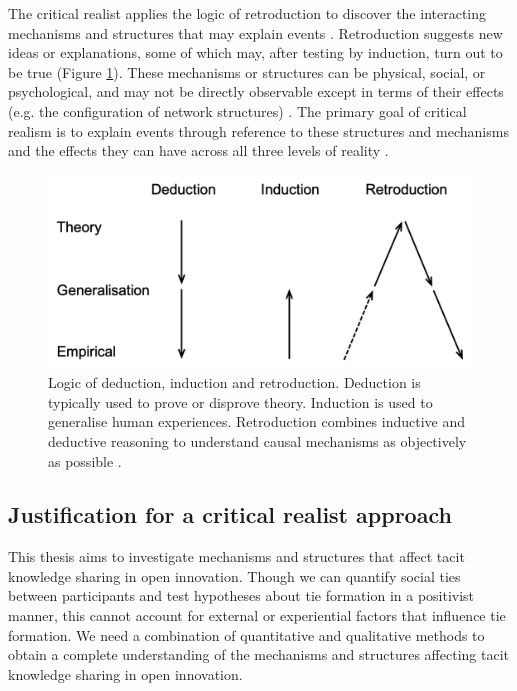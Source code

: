 The critical realist applies the logic of retroduction to discover the interacting mechanisms and structures that may explain events \citep{sayer1999realism,wynn2012principles}. Retroduction suggests new ideas or explanations, some of which may, after testing by induction, turn out to be true (Figure \ref{fig:retroduction}). These mechanisms or structures can be physical, social, or psychological, and may not be directly observable except in terms of their effects (e.g. the configuration of network structures) \citep{mcavoy2018critical}. The primary goal of critical realism is to explain events through reference to these structures and mechanisms and the effects they can have across all three levels of reality \citep{wynn2012principles,fletcher2017applying}. \medskip

\begin{figure}[h!]
\centering
\includegraphics[width=0.7\linewidth]{Images/retroduction.png}
\caption[Logic of deduction, induction and retroduction]{Logic of deduction, induction and retroduction. Deduction is typically used to prove or disprove theory. Induction is used to generalise human experiences. Retroduction combines inductive and deductive reasoning to understand causal mechanisms as objectively as possible \citep{saether1998retroduction}.}
\label{fig:retroduction}
\end{figure}

\subsection{Justification for a critical realist approach}

This thesis aims to investigate mechanisms and structures that affect tacit knowledge sharing in open innovation. Though we can quantify social ties between participants and test hypotheses about tie formation in a positivist manner, this cannot account for external or experiential factors that influence tie formation. We need a combination of quantitative and qualitative methods to obtain a complete understanding of the mechanisms and structures affecting tacit knowledge sharing in open innovation. \medskip

